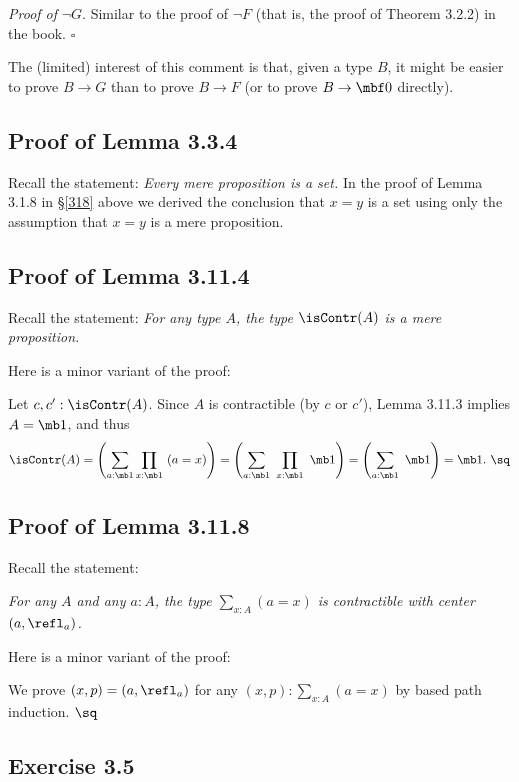 \documentclass[12pt]{article}
\begin{document}
\nn\emph{Proof of} $\neg G$. Similar to the proof of $\neg F$ (that is, the proof of Theorem 3.2.2) in the book. $\square$

The (limited) interest of this comment is that, given a type $B$, it might be easier to prove $B\to G$ than to prove $B\to F$ (or to prove $B\to\mbf0$ directly). 


\subsection{Proof of Lemma 3.3.4}

Recall the statement: \emph{Every mere proposition is a set.} In the proof of Lemma 3.1.8 in \S\ref{318} above we derived the conclusion that $x=y$ is a set using only the assumption that $x=y$ is a mere proposition.


\subsection{Proof of Lemma 3.11.4} 

Recall the statement: \emph{For any type $A$, the type $\isContr(A)$ is a mere proposition.}

Here is a minor variant of the proof:

Let $c,c':\isContr(A)$. Since $A$ is contractible (by $c$ or $c'$), Lemma 3.11.3 implies $A=\mb1$, and thus 
$$
\isContr(A)=\left(\sum_{a:\mb1}\prod_{x:\mb1}\ (a=x)\right)=\left(\sum_{a:\mb1}\ \prod_{x:\mb1}\ \mb1\right)=\left(\sum_{a:\mb1}\ \mb1\right)=\mb1.\ \sq
$$


\subsection{Proof of Lemma 3.11.8} 

Recall the statement: 

\nn\emph{For any $A$ and any $a:A$, the type $\sum_{x:A}(a=x)$ is contractible with center $(a,\refl_a)$.}

Here is a minor variant of the proof:

We prove $(x,p)=(a,\refl_a)$ for any $(x,p):\sum_{x:A}(a=x)$ by based path induction. $\sq$


\subsection{Exercise 3.5}
\end{document}
